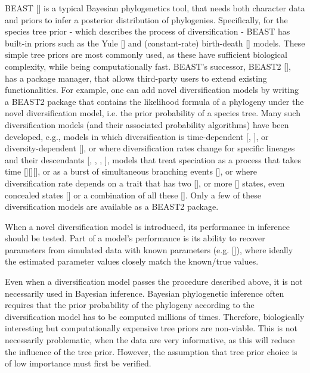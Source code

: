 BEAST [\cite{drummond2007beast}] is a typical Bayesian phylogenetics tool, 
that needs both character data and priors to infer a posterior distribution of phylogenies.
Specifically, for the species tree prior - which describes the process of diversification - 
BEAST has built-in priors such as the Yule [\cite{yule}] and 
(constant-rate) birth-death [\cite{nee1994reconstructed}] models.
These simple tree priors are most commonly used, as these 
have sufficient biological complexity, while being computationally fast.
BEAST's successor, BEAST2 [\cite{bouckaert2014beast}],
has a package manager, that allows third-party users to extend existing functionalities. For example, one can add novel diversification models by writing a BEAST2 package that contains the likelihood formula
of a phylogeny under the novel diversification model, i.e. the prior probability of a species tree.
Many such diversification models (and their associated probability algorithms) have been developed, e.g., models in which diversification is 
time-dependent [\cite{nee1994reconstructed}, \cite{rabosky2008explosive}], 
or diversity-dependent [\cite{etienne2011diversity}],
or where diversification rates change for specific lineages and their descendants [\cite{etienne2012conceptual}, 
\cite{rabosky2014automatic}, \cite{alfaro2009nine}, \cite{laudanno2018sls}], models that treat speciation as a process that takes 
time [\cite{rosindell2010protracted}][\cite{etienne2012prolonging}][\cite{lambert2015reconstructed}], 
or as a burst of simultaneous branching
events [\cite{laudanno2018mbd}], or where diversification rate
depends on a trait that has two [\cite{maddison2007estimating}], 
or more [\cite{fitzjohn2012diversitree}] states,
even concealed states [\cite{beaulieu2016detecting}] 
or a combination of all these [\cite{herrera2018detecting}].
Only a few of these diversification models are available as a BEAST2 package.

When a novel diversification model is introduced,
its performance in inference should be tested.
Part of a model's performance is its ability to recover parameters from simulated data with known parameters (e.g. [\cite{etienne2014estimating}]), where ideally the estimated parameter values closely match the known/true values.

Even when a diversification model passes the procedure described above,
it is not necessarily used in Bayesian inference.
Bayesian phylogenetic inference often requires that the prior probability of the phylogeny according to the diversification model has to be computed millions of times. Therefore, biologically interesting but computationally expensive tree priors are non-viable. This is not necessarily problematic, when the data are very informative, as this will reduce the influence of the tree prior.
However, the assumption that tree prior choice is of low importance must first be verified.

